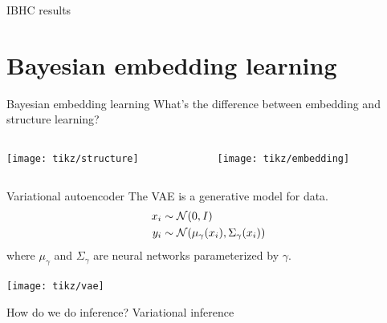 \documentclass[10pt, compress]{beamer}
\begin{document}
\begin{frame}{IBHC results}
  \centering
\end{frame}

\section{Bayesian embedding learning}

\begin{frame}{Bayesian embedding learning}
  \centering
  What's the difference between embedding and structure learning?
  \pause
  \begin{center}
    \begin{columns}
      \begin{column}{0.3\textwidth}
        \texttt{[image: tikz/structure]}
      \end{column}
    \pause
      \begin{column}{0.3\textwidth}
        \texttt{[image: tikz/embedding]}
      \end{column}
    \end{columns}
  \end{center}
\end{frame}
\begin{frame}{Variational autoencoder}
  The VAE is a generative model for data.
  \begin{align*}
    x_i &\sim  \mathcal{N}(0, I) \\
    y_i &\sim  \mathcal{N}(\mu_\gamma(x_i), \Sigma_\gamma(x_i))
  \end{align*}
  where $\mu_\gamma$ and $\Sigma_\gamma$ are neural networks parameterized by $\gamma$.

  \pause
  \centering
  \texttt{[image: tikz/vae]}
  \pause
   
  How do we do inference?
  \alert<+>{Variational inference}
\end{frame}
\end{document}
